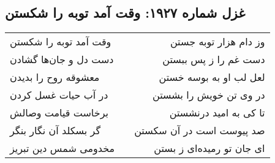 \begin{center}
\section*{غزل شماره ۱۹۲۷: وقت آمد توبه را شکستن}
\label{sec:1927}
\begin{longtable}{l p{0.5cm} r}
وقت آمد توبه را شکستن
&&
وز دام هزار توبه جستن
\\
دست دل و جان‌ها گشادن
&&
دست غم را ز پس ببستن
\\
معشوقه روح را بدیدن
&&
لعل لب او به بوسه خستن
\\
در آب حیات غسل کردن
&&
در وی تن خویش را بشستن
\\
برخاست قیامت وصالش
&&
تا کی به امید درنشستن
\\
گر بسکلد آن نگار بنگر
&&
صد پیوست است در آن سکستن
\\
مخدومی شمس دین تبریز
&&
ای جان تو رمیده‌ای ز بستن
\\
\end{longtable}
\end{center}
